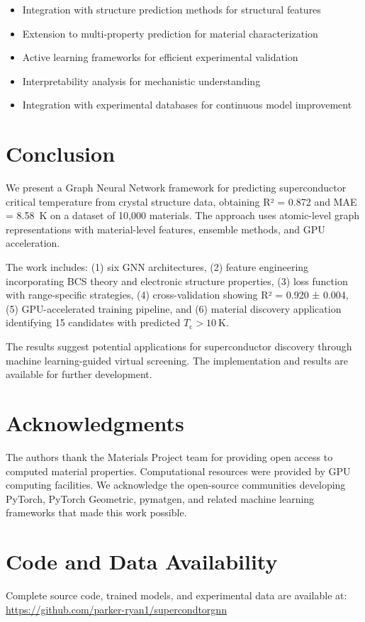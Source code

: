 \documentclass[11pt,a4paper]{article}
\begin{document}
\begin{itemize}
    \item Integration with structure prediction methods for structural features
    \item Extension to multi-property prediction for material characterization
    \item Active learning frameworks for efficient experimental validation
    \item Interpretability analysis for mechanistic understanding
    \item Integration with experimental databases for continuous model improvement
\end{itemize}

\section{Conclusion}

We present a Graph Neural Network framework for predicting superconductor critical temperature from crystal structure data, obtaining R² = 0.872 and MAE = \SI{8.58}{\kelvin} on a dataset of 10,000 materials. The approach uses atomic-level graph representations with material-level features, ensemble methods, and GPU acceleration.

The work includes: (1) six GNN architectures, (2) feature engineering incorporating BCS theory and electronic structure properties, (3) loss function with range-specific strategies, (4) cross-validation showing R² = \num{0.920} ± \num{0.004}, (5) GPU-accelerated training pipeline, and (6) material discovery application identifying 15 candidates with predicted $T_{\text{c}} > \SI{10}{\kelvin}$.

The results suggest potential applications for superconductor discovery through machine learning-guided virtual screening. The implementation and results are available for further development.

\section*{Acknowledgments}

The authors thank the Materials Project team for providing open access to computed material properties. Computational resources were provided by GPU computing facilities. We acknowledge the open-source communities developing PyTorch, PyTorch Geometric, pymatgen, and related machine learning frameworks that made this work possible.

\section*{Code and Data Availability}

Complete source code, trained models, and experimental data are available at: \url{https://github.com/parker-ryan1/supercondtorgnn}



\end{document}
